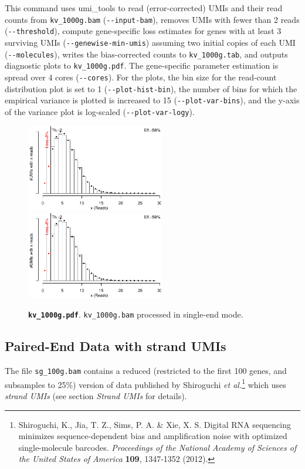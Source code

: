 \documentclass[10pt]{article}
\newcommand{\ddarg}[1]{\texttt{-{}-#1}}
\begin{document}

This command uses umi\_tools to read (error-corrected) UMIs and their read counts from \texttt{kv\_1000g.bam} (\ddarg{input-bam}), removes UMIs with fewer than 2 reads (\ddarg{threshold}), compute gene-specific loss estimates for genes with at least 3 surviving UMIs (\ddarg{genewise-min-umis}) assuming two initial copies of each UMI (\ddarg{molecules}), writes the bias-corrected counts to \texttt{kv\_1000g.tab}, and outputs diagnostic plots to \texttt{kv\_1000g.pdf}. The gene-specific parameter estimation is spread over 4 cores (\ddarg{cores}). For the plots, the bin size for the read-count distribution plot is set to 1 (\ddarg{plot-hist-bin}), the number of bins for which the empirical variance is plotted is increased to 15 (\ddarg{plot-var-bins}), and the y-axis of the variance plot is log-scaled (\ddarg{plot-var-logy}).

\begin{figure}[H]
{\centering
\includegraphics[width=6cm,page=1]{../examples/kv_1000g.pdf}
\includegraphics[width=6cm,page=2]{../examples/kv_1000g.pdf}
\\}
\caption*{\textbf{\texttt{kv\_1000g.pdf}}. \texttt{kv\_1000g.bam} processed in single-end mode.}
\end{figure}

\subsection{Paired-End Data with strand UMIs}

The file \texttt{sg\_100g.bam} contains a reduced (restricted to the first 100 genes, and subsamples to 25\%) version of data published by Shiroguchi \textit{et al.}\footnote{Shiroguchi, K., Jia, T. Z., Sims, P. A. \& Xie, X. S. Digital RNA sequencing minimizes sequence-dependent bias and amplification noise with optimized single-molecule barcodes. \textit{Proceedings of the National Academy of Sciences of the United States of America} \textbf{109}, 1347-1352 (2012).} which uses \emph{strand UMIs} (see section \emph{Strand UMIs} for details).
\end{document}
